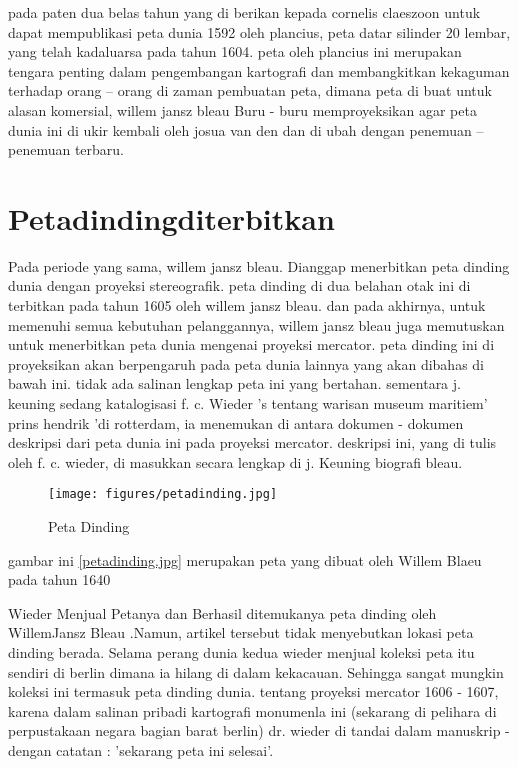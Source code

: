 pada paten dua belas tahun yang di berikan kepada cornelis claeszoon untuk dapat mempublikasi peta dunia 1592 oleh plancius, peta datar silinder 20 lembar,
yang telah kadaluarsa pada tahun 1604. peta oleh plancius ini merupakan tengara penting dalam pengembangan kartografi dan membangkitkan kekaguman 
terhadap orang – orang di zaman pembuatan peta, dimana peta di buat untuk alasan komersial, willem jansz bleau Buru - buru memproyeksikan agar 
peta dunia ini di ukir kembali oleh josua van den dan di ubah dengan penemuan – penemuan terbaru. 


\section{Petadindingditerbitkan}
Pada periode yang sama, willem jansz bleau. Dianggap menerbitkan peta dinding dunia dengan proyeksi stereografik. 
peta dinding di dua belahan otak ini di terbitkan pada tahun 1605 oleh willem jansz bleau. dan pada akhirnya, untuk memenuhi semua kebutuhan pelanggannya, willem jansz bleau juga memutuskan untuk menerbitkan peta dunia mengenai proyeksi mercator. 
peta dinding ini di proyeksikan akan berpengaruh pada peta dunia lainnya yang akan dibahas di bawah ini. tidak ada salinan lengkap peta ini yang bertahan. sementara j. keuning sedang katalogisasi f. c. Wieder 's tentang warisan museum maritiem' 
prins hendrik 'di rotterdam, ia menemukan di antara dokumen - dokumen deskripsi dari peta dunia ini pada proyeksi mercator. 
deskripsi ini, yang di tulis oleh f. c. wieder, di masukkan secara lengkap di j. Keuning biografi bleau. 

\cite{campbell1976descriptive}

\begin{figure}[ht]
	

\centerline{\texttt{[image: figures/petadinding.jpg]}}
	

\caption{Peta Dinding}
	

\label{petadinding}

\end{figure}

gambar ini \ref{petadinding.jpg} merupakan peta yang dibuat oleh Willem Blaeu pada tahun 1640
 
Wieder Menjual Petanya dan Berhasil ditemukanya peta dinding oleh WillemJansz Bleau .Namun, artikel tersebut tidak menyebutkan lokasi peta dinding berada. 
Selama perang dunia kedua wieder menjual koleksi peta itu sendiri di berlin dimana ia hilang di dalam kekacauan. 
Sehingga sangat mungkin koleksi ini termasuk peta dinding dunia. tentang proyeksi mercator 1606 - 1607, 
karena dalam salinan pribadi kartografi monumenla ini (sekarang di pelihara di perpustakaan negara bagian barat berlin) 
dr. wieder di tandai dalam manuskrip - dengan catatan : 'sekarang peta ini selesai'. 



